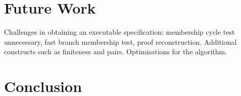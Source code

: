 \documentclass[sigplan,10pt,anonymous,review]{acmart}
\begin{document}
\section{Future Work}
Challenges in obtaining an executable specification: membership cycle test unnecessary, fast branch membership test, proof reconstruction.
Additional constructs such as finiteness and pairs.
Optimisations for the algorithm.

\section{Conclusion}

\begin{acks}
\end{acks}



\end{document}
